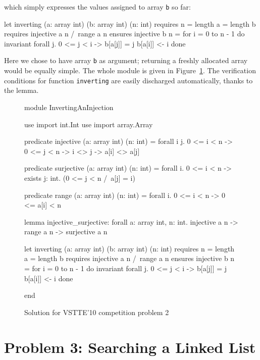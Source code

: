 which simply expresses the values assigned to array \texttt{b} so far:
\begin{whycode}
  let inverting (a: array int) (b: array int) (n: int)
    requires { n = length a = length b }
    requires { injective a n /\ range a n }
    ensures  { injective b n }
  = for i = 0 to n - 1 do
      invariant { forall j. 0 <= j < i -> b[a[j]] = j }
      b[a[i]] <- i
    done
\end{whycode}
Here we chose to have array \texttt{b} as argument; returning a
freshly allocated array would be equally simple.
The whole module is given in Figure~\ref{fig:Inverting}.
The verification conditions for function \texttt{inverting} are easily
discharged automatically, thanks to the lemma.
\begin{figure}
  \centering
\begin{whycode}
module InvertingAnInjection

  use import int.Int
  use import array.Array

  predicate injective (a: array int) (n: int) =
    forall i j. 0 <= i < n -> 0 <= j < n -> i <> j -> a[i] <> a[j]

  predicate surjective (a: array int) (n: int) =
    forall i. 0 <= i < n -> exists j: int. (0 <= j < n /\ a[j] = i)

  predicate range (a: array int) (n: int) =
    forall i. 0 <= i < n -> 0 <= a[i] < n

  lemma injective_surjective:
    forall a: array int, n: int.
      injective a n -> range a n -> surjective a n

  let inverting (a: array int) (b: array int) (n: int)
    requires { n = length a = length b }
    requires { injective a n /\ range a n }
    ensures  { injective b n }
  = for i = 0 to n - 1 do
      invariant { forall j. 0 <= j < i -> b[a[j]] = j }
      b[a[i]] <- i
    done

end
\end{whycode}
\vspace*{-1em}%
  \caption{Solution for VSTTE'10 competition problem 2}
  \label{fig:Inverting}
\end{figure}

\section{Problem 3: Searching a Linked List}

